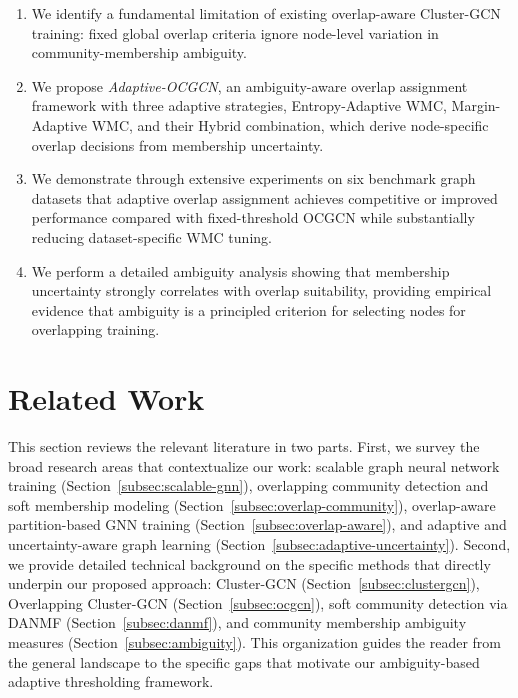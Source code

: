 \documentclass[pdflatex,sn-mathphys-num]{sn-jnl}%
\theoremstyle{thmstyleone}%
\theoremstyle{thmstyletwo}%
\theoremstyle{thmstylethree}%
\begin{document}
\begin{enumerate}
  \item We identify a fundamental limitation of existing overlap-aware Cluster-GCN training: fixed global overlap criteria ignore node-level variation in community-membership ambiguity.
  
  \item We propose \textit{Adaptive-OCGCN}, an ambiguity-aware overlap assignment framework with three adaptive strategies, Entropy-Adaptive WMC, Margin-Adaptive WMC, and their Hybrid combination, which derive node-specific overlap decisions from membership uncertainty.
  
  \item We demonstrate through extensive experiments on six benchmark graph datasets that adaptive overlap assignment achieves competitive or improved performance compared with fixed-threshold OCGCN while substantially reducing dataset-specific WMC tuning.
  
  \item We perform a detailed ambiguity analysis showing that membership uncertainty strongly correlates with overlap suitability, providing empirical evidence that ambiguity is a principled criterion for selecting nodes for overlapping training.
\end{enumerate}

\section{Related Work}
\label{sec:related}

This section reviews the relevant literature in two parts. 
First, we survey the broad research areas that contextualize our work: scalable graph neural network training (Section~\ref{subsec:scalable-gnn}), overlapping community detection and soft membership modeling (Section~\ref{subsec:overlap-community}), overlap-aware partition-based GNN training (Section~\ref{subsec:overlap-aware}), and adaptive and uncertainty-aware graph learning (Section~\ref{subsec:adaptive-uncertainty}). 
Second, we provide detailed technical background on the specific methods that directly underpin our proposed approach: Cluster-GCN (Section~\ref{subsec:clustergcn}), Overlapping Cluster-GCN (Section~\ref{subsec:ocgcn}), soft community detection via DANMF (Section~\ref{subsec:danmf}), and community membership ambiguity measures (Section~\ref{subsec:ambiguity}). 
This organization guides the reader from the general landscape to the specific gaps that motivate our ambiguity-based adaptive thresholding framework.
\end{document}
